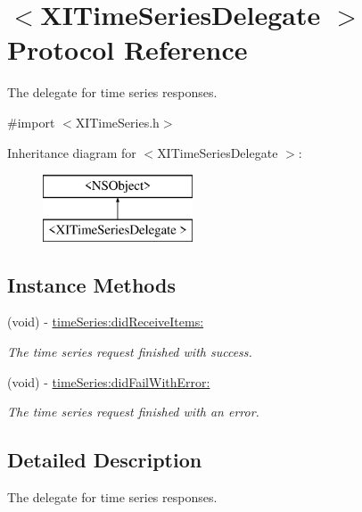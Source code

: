 \hypertarget{protocol_x_i_time_series_delegate_01-p}{}\section{$<$X\+I\+Time\+Series\+Delegate $>$ Protocol Reference}
\label{protocol_x_i_time_series_delegate_01-p}


The delegate for time series responses.  




{\ttfamily \#import $<$X\+I\+Time\+Series.\+h$>$}

Inheritance diagram for $<$X\+I\+Time\+Series\+Delegate $>$\+:\begin{figure}[H]
\begin{center}
\leavevmode
\includegraphics[height=2.000000cm]{protocol_x_i_time_series_delegate_01-p}
\end{center}
\end{figure}
\subsection*{Instance Methods}
\begin{DoxyCompactItemize}
\item 
(void) -\/ \hyperlink{protocol_x_i_time_series_delegate_01-p_acb5b2883bf84fc539593d6821319cda1}{time\+Series\+:did\+Receive\+Items\+:}
\begin{DoxyCompactList}\small\item\em The time series request finished with success. \end{DoxyCompactList}\item 
(void) -\/ \hyperlink{protocol_x_i_time_series_delegate_01-p_a7ec763fef4ff3ee7b58b87ea0a855c2f}{time\+Series\+:did\+Fail\+With\+Error\+:}
\begin{DoxyCompactList}\small\item\em The time series request finished with an error. \end{DoxyCompactList}\end{DoxyCompactItemize}


\subsection{Detailed Description}
The delegate for time series responses. 

